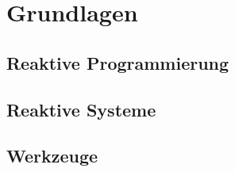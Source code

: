 
\section{Grundlagen}
\label{section:grundlagen}

\subsection{Reaktive Programmierung}
\label{section:reaktive_programmierung}

\subsection{Reaktive Systeme}
\label{section:reaktive_systeme}

\subsection{Werkzeuge}
\label{section:werkzeuge}